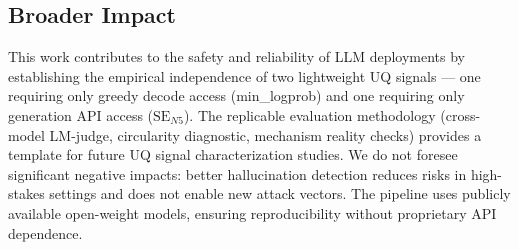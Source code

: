 \subsection{Broader Impact}

This work contributes to the safety and reliability of LLM deployments by establishing the empirical independence of two lightweight UQ signals --- one requiring only greedy decode access (min\_logprob) and one requiring only generation API access ($\text{SE}_{N5}$). The replicable evaluation methodology (cross-model LM-judge, circularity diagnostic, mechanism reality checks) provides a template for future UQ signal characterization studies. We do not foresee significant negative impacts: better hallucination detection reduces risks in high-stakes settings and does not enable new attack vectors. The pipeline uses publicly available open-weight models, ensuring reproducibility without proprietary API dependence.
